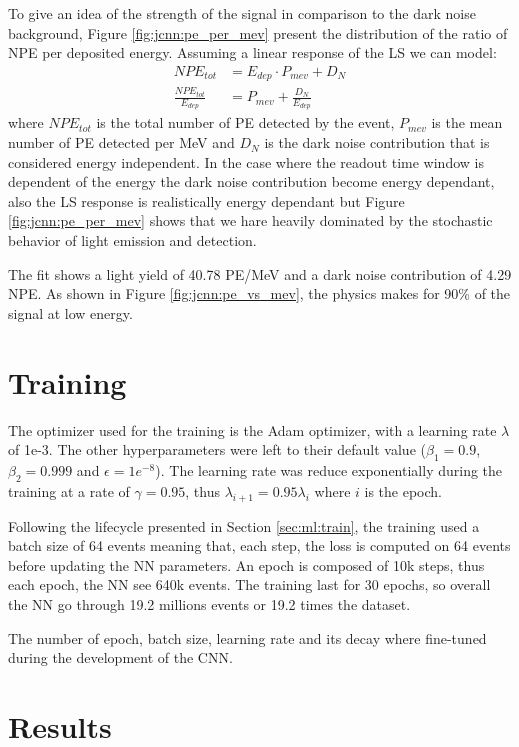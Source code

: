 \documentclass[../main.tex]{subfiles}
\begin{document}
{{To give an idea of the strength of the signal in comparison to the dark noise background, Figure \ref{fig:jcnn:pe_per_mev} present the distribution of the ratio of NPE per deposited energy. Assuming a linear response of the LS we can model:
\begin{align}
  NPE_{tot} &= E_{dep} \cdot P_{mev} + D_{N} \\
  \frac{NPE_{tot}}{E_{dep}} &= P_{mev} + \frac{D_{N}}{E_{dep}} \label{eq:jcnn:pe_per_mev}
\end{align}
where $NPE_{tot}$ is the total number of PE detected by the event, $P_{mev}$ is the mean number of PE detected per MeV and $D_{N}$ is the dark noise contribution that is considered energy independent. In the case where the readout time window is dependent of the energy the dark noise contribution become energy dependant, also the LS response is realistically energy dependant but Figure \ref{fig:jcnn:pe_per_mev} shows that we hare heavily dominated by the stochastic behavior of light emission and detection.

The fit shows a light yield of 40.78 PE/MeV and a dark noise contribution of 4.29 NPE. As shown in Figure \ref{fig:jcnn:pe_vs_mev}, the physics makes for 90\% of the signal at low energy.

\section{Training}

The optimizer used for the training is the Adam \cite{kingma_adam_2017} optimizer, with a learning rate $\lambda$ of 1e-3. The other hyperparameters were left to their default value ($\beta_1= 0.9$, $\beta_2 = 0.999$ and $\epsilon = 1e^{-8}$). The learning rate was reduce exponentially during the training at a rate of $\gamma = 0.95$, thus $\lambda_{i+1} = 0.95\lambda_i$ where $i$ is the epoch.

Following the lifecycle presented in Section \ref{sec:ml:train}, the training used a batch size of 64 events meaning that, each step, the loss is computed on 64 events before updating the NN parameters. An epoch is composed of 10k steps, thus each epoch, the NN see 640k events. The training last for 30 epochs, so overall the NN go through 19.2 millions events or 19.2 times the dataset.

The number of epoch, batch size, learning rate and its decay where fine-tuned during the development of the CNN.

\section{Results}
\label{sec:jcnn:results}

}}
\end{document}
